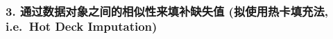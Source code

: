 \documentclass[11pt]{article}
\begin{document}
    \begin{center}
    \end{center}
    { \hspace*{\fill} \\}
    
    \subsubsection{3. 通过数据对象之间的相似性来填补缺失值
(拟使用热卡填充法, i.e.~Hot Deck
Imputation)}\label{ux901aux8fc7ux6570ux636eux5bf9ux8c61ux4e4bux95f4ux7684ux76f8ux4f3cux6027ux6765ux586bux8865ux7f3aux5931ux503c-ux62dfux4f7fux7528ux70edux5361ux586bux5145ux6cd5-i.e.-hot-deck-imputation}
\end{document}
